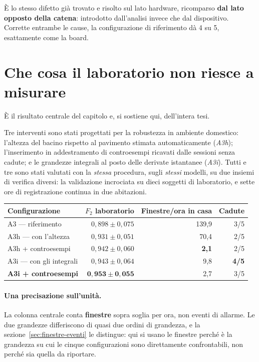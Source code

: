 È lo stesso difetto già trovato e risolto sul lato hardware, ricomparso \textbf{dal lato opposto della catena}: introdotto dall'analisi invece che dal dispositivo. Corrette entrambe le cause, la configurazione di riferimento dà 4 su 5, esattamente come la board.

\section{Che cosa il laboratorio non riesce a misurare}
\label{sec:rovesciamento}

È il risultato centrale del capitolo e, si sostiene qui, dell'intera tesi.

Tre interventi sono stati progettati per la robustezza in ambiente domestico:
l'altezza del bacino rispetto al pavimento stimata automaticamente
(\emph{A3h}); l'inserimento in addestramento di controesempi ricavati dalle
sessioni senza cadute; e le grandezze integrali al posto delle derivate
istantanee (\emph{A3i}). Tutti e tre sono stati valutati con la \emph{stessa}
procedura, sugli \emph{stessi} modelli, su due insiemi di verifica diversi:
la validazione incrociata su dieci soggetti di laboratorio, e sette ore di
registrazione continua in due abitazioni.

\begin{center}
\begin{tabular}{lrrr}
\toprule
Configurazione & $F_2$ laboratorio & Finestre/ora in casa & Cadute \\
\midrule
A3 --- riferimento & $0{,}898 \pm 0{,}075$ & 139,9 & 3/5 \\
A3h --- con l'altezza & $0{,}931 \pm 0{,}051$ & 70,4 & 2/5 \\
A3h + controesempi & $0{,}942 \pm 0{,}060$ & \textbf{2,1} & 2/5 \\
A3i --- con gli integrali & $0{,}943 \pm 0{,}064$ & 9,8 & \textbf{4/5} \\
\textbf{A3i + controesempi} & $\mathbf{0{,}953 \pm 0{,}055}$ & 2,7 & 3/5 \\
\bottomrule
\end{tabular}
\end{center}

\paragraph{Una precisazione sull'unità.} La colonna centrale conta
\textbf{finestre} sopra soglia per ora, non eventi di allarme. Le due
grandezze differiscono di quasi due ordini di grandezza, e la
sezione~\ref{sec:finestre-eventi} le distingue: qui si usano le finestre
perché è la grandezza su cui le cinque configurazioni sono direttamente
confrontabili, non perché sia quella da riportare.

